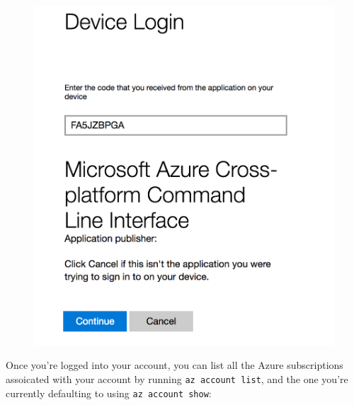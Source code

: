 \documentclass[]{book}
\theoremstyle{definition}
\theoremstyle{definition}
\theoremstyle{definition}
\theoremstyle{remark}
\begin{document}
\begin{figure}
\centering
\includegraphics{imgs/azlogin.png}
\caption{}
\end{figure}

Once you're logged into your account, you can list all the Azure
subscriptions assoicated with your account by running
\texttt{az\ account\ list}, and the one you're currently defaulting to
using \texttt{az\ account\ show}:
\end{document}
